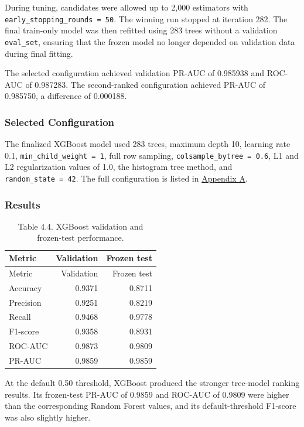 \documentclass[
  canadian,
  12pt,
]{article}
\let\reportOrigSubsubsection\subsubsection
\renewcommand{\subsubsection}{\par\Needspace*{5\baselineskip}\reportOrigSubsubsection}%
\begin{document}
During tuning, candidates were allowed up to 2,000 estimators with
\texttt{early\_\allowbreak{}stopping\_\allowbreak{}rounds\ =\ 50}. The winning run stopped at
iteration 282. The final train-only model was then refitted using 283
trees without a validation \texttt{eval\_set}, ensuring that the frozen
model no longer depended on validation data during final fitting.

The selected configuration achieved validation PR-AUC of 0.985938 and
ROC-AUC of 0.987283. The second-ranked configuration achieved PR-AUC of
0.985750, a difference of 0.000188.

\subsubsection{Selected Configuration}\label{selected-configuration-3}

The finalized XGBoost model used 283 trees, maximum depth 10, learning
rate 0.1, \texttt{min\_child\_weight\ =\ 1}, full row sampling,
\texttt{colsample\_bytree\ =\ 0.6}, L1 and L2 regularization values of
1.0, the histogram tree method, and \texttt{random\_state\ =\ 42}. The
full configuration is listed in \hyperref[sec-app-a]{Appendix A}.

\subsubsection{Results}\label{sec-4-4-results}

\begin{longtable}[]{@{}lrr@{}}
\caption{Table 4.4. XGBoost validation and frozen-test
performance.}\tabularnewline
\toprule\noalign{}
Metric & Validation & Frozen test \\
\midrule\noalign{}
\endfirsthead
\toprule\noalign{}
Metric & Validation & Frozen test \\
\midrule\noalign{}
\endhead
\bottomrule\noalign{}
\endlastfoot
Accuracy & 0.9371 & 0.8711 \\
Precision & 0.9251 & 0.8219 \\
Recall & 0.9468 & 0.9778 \\
F1-score & 0.9358 & 0.8931 \\
ROC-AUC & 0.9873 & 0.9809 \\
PR-AUC & 0.9859 & 0.9859 \\
\end{longtable}

At the default 0.50 threshold, XGBoost produced the stronger tree-model
ranking results. Its frozen-test PR-AUC of 0.9859 and ROC-AUC of 0.9809
were higher than the corresponding Random Forest values, and its
default-threshold F1-score was also slightly higher.
\end{document}
